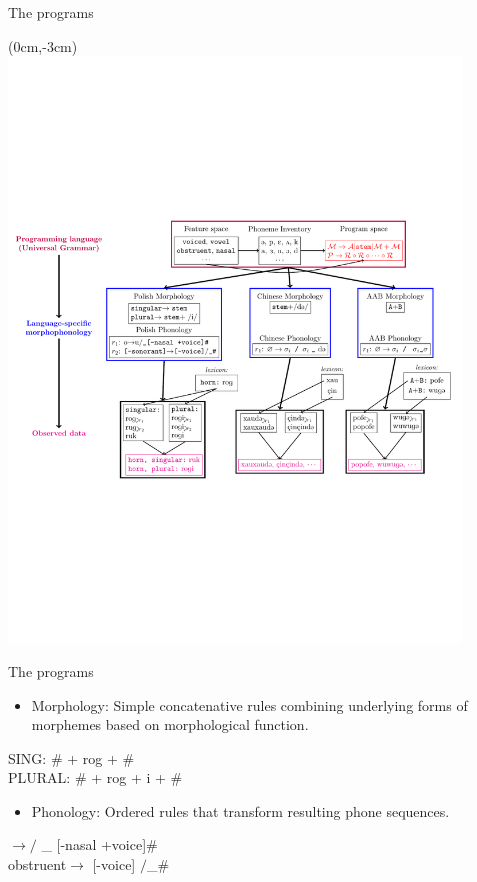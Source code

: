 \documentclass{beamer}
\begin{document}
\begin{frame}{The programs}
\begin{textblock*}{5cm}(0cm,-3cm)
  \includegraphics[pages={1}, width=12cm]{generativeModel.pdf}    \end{textblock*}
\end{frame}

\begin{frame}{The programs}
  \begin{itemize}
  \item Morphology: Simple concatenative rules combining
    underlying forms of morphemes based on
    morphological function.
  \end{itemize}
  SING: \# + rog + \#
  \\PLURAL: \# + rog + i + \#

  \begin{itemize}
  \item Phonology: Ordered rules that transform resulting phone sequences.
  \end{itemize}
  $\to$$/$ \_ [-nasal +voice]\#\\
  obstruent$\to$ [-voice] $/$\_\#
\end{frame}
\end{document}
